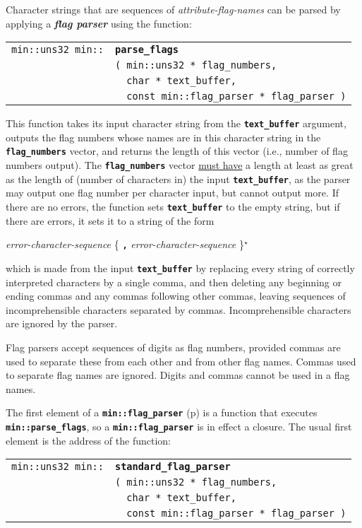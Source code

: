 \documentclass[12pt]{article}
\makeatletter
\newcommand{\TT}[1]{{\tt \bfseries #1}}
\newcommand{\STAR}{{\Large $^\star$}}
\newcommand{\key}[1]{{\bf \em #1}\index{#1}}
\newcommand{\ttindex}[1]{\index{#1@{\tt #1}}}
\newcommand{\pagref}[1]{p\pageref{#1}}
\newcommand{\EOL}{\penalty \exhyphenpenalty}
\newenvironment{indpar}[1][0.3in]%
	{\begin{list}{}%
		     {\setlength{\itemsep}{0in}%
		      \setlength{\topsep}{0in}%
		      \setlength{\parsep}{1ex}%
		      \setlength{\labelwidth}{#1}%
		      \setlength{\leftmargin}{#1}%
		      \addtolength{\leftmargin}{\labelsep}}%
	 \item}%
	{\end{list}}
\newcommand{\LABEL}[1]{\label{#1}}
\newlength{\ARGBREAKLENGTH}
\newcommand{\ARGBREAK}[1][\ARGBREAKLENGTH]{\\&\hspace*{#1}}
\newcommand{\MINKEY}[1]%
	   {\TT{#1}\ttindex{min::#1}\ttindex{#1}}
\makeatother
\begin{document}
Character strings that are sequences of {\em attribute-flag-names}
can be parsed by applying a \key{flag parser} using the function:

\begin{indpar}[1em]\begin{tabular}{r@{}l}
\verb|min::uns32 min::| & \MINKEY{parse\_flags}\ARGBREAK
    \verb|( min::uns32 * flag_numbers,|\ARGBREAK
    \verb|  char * text_buffer,|\ARGBREAK
    \verb|  const min::flag_parser * flag_parser )|
\LABEL{MIN::PARSE_FLAGS} \\
\end{tabular}\end{indpar}

This function takes its input character string from the \TT{text\_\EOL buffer}
argument, outputs the flag numbers whose names are in this character
string in the \TT{flag\_\EOL numbers} vector, and returns the length
of this vector (i.e., number of flag numbers output).
The \TT{flag\_\EOL numbers} vector \underline{must have}
a length
at least as great as the length of (number of characters in) the
input \TT{text\_\EOL buffer}, as the parser may output
one flag number per character input, but cannot output more.
If there are no errors, the function sets
\TT{text\_\EOL buffer} to the empty string, but if there are errors,
it sets it to a string of the form
\begin{center}
{\em error-character-sequence}
    \{ \TT{,} {\em error-character-sequence} \}\STAR{}
\end{center}
which is made from the input \TT{text\_\EOL buffer} by replacing
every string of correctly interpreted characters by a single comma,
and then deleting any beginning or ending commas and any commas
following other commas,
leaving sequences of incomprehensible
characters separated by commas.  Incomprehensible characters are ignored
by the parser.

Flag parsers accept sequences of digits as flag numbers,
provided commas are used to separate these from each other and from other
flag names.  Commas used to separate flag names are ignored.
Digits and commas cannot be used in a flag names.

The first element of a \TT{min::flag\_parser}
(\pagref{MIN::FLAG_PARSER})
is a function that executes
\TT{min::\EOL parse\_\EOL flags}, so a \TT{min::flag\_\EOL parser}
is in effect a closure.  The usual first element is the address of
the function:

\begin{indpar}[1em]\begin{tabular}{r@{}l}
\verb|min::uns32 min::| & \MINKEY{standard\_flag\_parser}\ARGBREAK
    \verb|( min::uns32 * flag_numbers,|\ARGBREAK
    \verb|  char * text_buffer,|\ARGBREAK
    \verb|  const min::flag_parser * flag_parser )|
\LABEL{MIN::STANDARD_FLAG_PARSER} \\
\end{tabular}\end{indpar}
\end{document}
